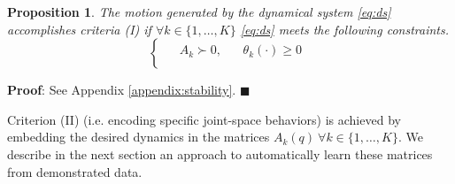 \documentclass[letterpaper, 10 pt, conference,fleqn]{ieeeconf}
\begin{document}
\newtheorem{prop1}{Proposition}
\begin{prop1}
\label{prop:stability}
The motion generated by the dynamical system \eqref{eq:ds} accomplishes criteria (I) if $ \forall k \in \{1,\dots,K\}  $ \eqref{eq:ds} meets the following constraints. 
\begin{equation}
\label{eq:first_criteria_stability}
\begin{cases}
\begin{split}
 & A_k \succ 0, & ~~~~ \theta_k(\cdot) \geq 0 \\
\end{split}
\end{cases}
\end{equation}    
\end{prop1}
\vspace{5pt}
\textbf{Proof}: See Appendix \ref{appendix:stability}. $\blacksquare$

Criterion (II) (i.e. encoding specific joint-space behaviors) is achieved by embedding the desired dynamics in the matrices $A_k(q)~ \forall k \in\{1,\dots,K\}$. We describe in the next section an approach to automatically learn these matrices from demonstrated data. 

\end{document}
